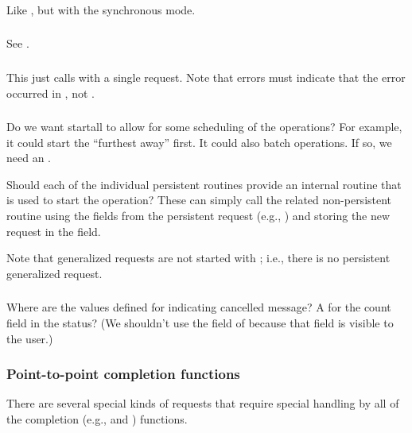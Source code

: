 \documentclass{article}
\begin{document}
\subsubsection{}
Like , but with the synchronous mode.

\subsubsection{}
See .

\subsubsection{}
This just calls  with a single request.  Note that
errors must indicate that the error occurred in , not
.  

\subsubsection{}
Do we want startall to allow for some scheduling of the operations?  For
example, it could start the ``furthest away'' first.  It could also batch
operations.
If so, we need an .

Should each of the individual persistent routines provide an internal
routine that is used to start the operation?
These can simply call the related non-persistent routine using the fields from
the persistent request (e.g., )
and storing the new request in the 
field. 

Note that generalized requests are not started with ; i.e.,
there is no persistent generalized request.

\subsubsection{}
Where are the values defined for indicating cancelled message?
A  for the count field in the
status?
(We shouldn't use the  field of
 because that field is visible to the user.)

\subsubsection{Point-to-point completion functions}
There are several special kinds of requests that require special handling by
all of the completion (e.g.,  and )
functions. 
\end{document}
